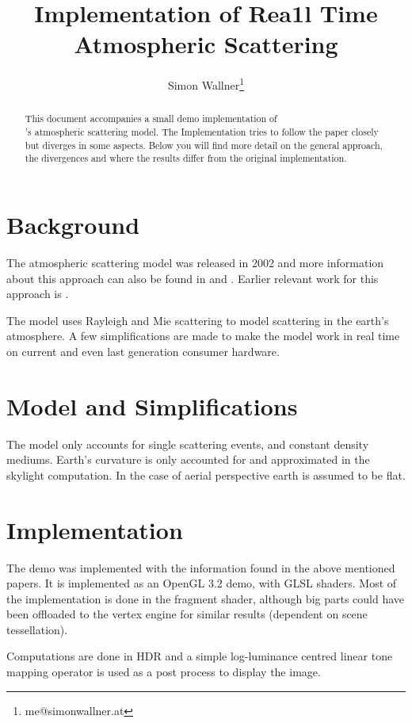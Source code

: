 \documentclass[12pt,a4paper]{scrartcl}
\author{Simon Wallner\footnote{me@simonwallner.at}}
\title{Implementation of Rea1l Time Atmospheric Scattering}
\begin{document}
\maketitle


\begin{abstract}
This document accompanies a small demo implementation of\\ \cite{HoffmanPreetham02Rendering-outdoor}'s atmospheric scattering model. The Implementation tries to follow the paper closely but diverges in some aspects. Below you will find more detail on the general approach, the divergences and where the results differ from the original implementation.
\end{abstract}


\section{Background}
The atmospheric scattering model \cite{HoffmanPreetham02Rendering-outdoor} was released in 2002 and more information about this approach can also be found in \cite{03ATI-LightScattering} and \cite{Preetham03Modeling-skylight}. Earlier relevant work for this approach is \cite{PreethamShirleySmits99A-practical-analytic}.

The model uses Rayleigh and Mie scattering to model scattering in the earth's atmosphere. A few simplifications are made to make the model work in real time on current and even last generation consumer hardware.


\section{Model and Simplifications}
The model only accounts for single scattering events, and constant density mediums. Earth's curvature is only accounted for and approximated in the skylight computation. In the case of aerial perspective earth is assumed to be flat.

\section{Implementation}
The demo was implemented with the information found in the above mentioned papers. It is implemented as an OpenGL 3.2 demo, with GLSL shaders. Most of the implementation is done in the fragment shader, although big parts could have been offloaded to the vertex engine for similar results (dependent on scene tessellation).

Computations are done in HDR and a simple log-luminance centred linear tone mapping operator is used as a post process to display the image.
\end{document}
